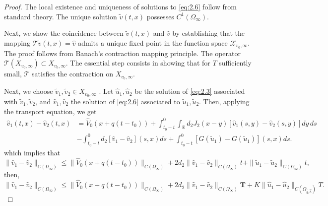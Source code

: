 \documentclass[a4paper,11pt]{amsart}
\theoremstyle{definition}
\numberwithin{equation}{section}
\theoremstyle{definition}
\begin{document}
\begin{proof}
The local existence and uniqueness of solutions to \eqref{eq:2.6} follow from standard theory. The unique solution $\tilde{v}(t,x)$ possesses $C^1(\Omega_\infty).$

Next, we show the coincidence between  $\widetilde{v}(t, x) $  and $\hat{v}$  by establishing that the mapping $\mathcal{T} \widetilde{v}(t, x) = \hat{v}$ admits a unique fixed point in the function space $\mathcal{X}_{v_0,\infty}$. The proof follows from Banach's contraction mapping principle. The operator $\mathcal{T}(X_{v_0,\infty}) \subset X_{v_0,\infty}  $. The essential step consists in showing that for $T$ sufficiently small, $\mathcal{T}$ satisfies the contraction on $X_{v_0,\infty}$.



Next, we choose  $\widetilde{v}_1, \widetilde{v}_2  \in X_{v_0, \infty}$ . Let \( \hat{u}_1, \hat{u}_2 \) be the solution of \eqref{eq:2.3} associated with \( \widetilde{v}_1, \widetilde{v}_2  \), and \( \hat{v}_1, \hat{v}_2 \) the solution of \eqref{eq:2.6} associated to \( \tilde{u}_1, \tilde{u}_2  \). Then, applying the transport equation, we get
\begin{equation*}
\begin{aligned}
\hat{v}_1(t,x) - \hat{v}_2(t,x) & =  \hat{V}_0(x+q(t-t_0))  + \int_{t_0-t}^0 \int_{\mathbb{R}} d_2 J_2(x-y)\left[\hat{v}_1(s,y) - \hat{v}_2(s,y)\right] dy\, ds \\&- \int_{t_0-t}^0 d_2\left[\hat{v}_1 - \hat{v}_2\right](s,x) ds + \int_{t_0-t}^0 \left[G(\widetilde{u}_1) -  G(\widetilde{u}_1)\right](s,x) ds.
\end{aligned}
\end{equation*}
which implies that
\[
\|\hat{v}_1 - \hat{v}_2\|_{C(\Omega_\infty)}
\leq  \| \hat{V}_0(x+q(t-t_0))\|_{C(\Omega_\infty)}  +2d_2 \|\hat{v}_1 - \hat{v}_2\|_{C(\Omega_\infty)} t
+ \|\widetilde{u}_1 - \widetilde{u}_2\|_{C(\Omega_\infty)} t,
\]
then,
\[
\|\hat{v}_1 - \hat{v}_2\|_{C(\Omega_\infty)}  \leq \| \hat{V}_0(x+q(t-t_0))\|_{C(\Omega_\infty)} + 2d_2  \|\hat{v}_1 - \hat{v}_2\|_{C(\Omega_\infty)} \mathbf{T}
+ K \|\hat{u}_1 - \hat{u}_2\|_{C(\Omega_{\hat{g},\hat{h}})} T.
\]


\end{proof}
\end{document}

